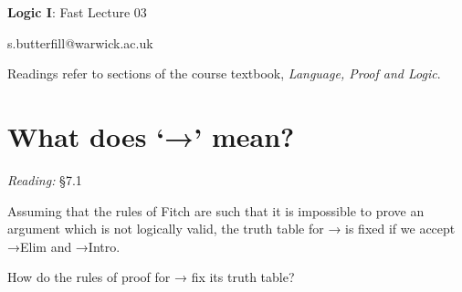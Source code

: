 \documentclass[12pt]{extarticle}
\date{}
\makeatletter
\def \ititle {Origins of Mind}
\def \isubtitle {Lecture 08}
\def \iemail{s.butterfill@warwick.ac.uk}
\makeatother
\begin{document}

\begin{multicols*}{3}

\setlength\footnotesep{1em}










\def \ititle {Logic I}
 
\def \isubtitle {Fast Lecture 03}
 
\begin{center}
 
{\Large
 
\textbf{\ititle}: \isubtitle
 
}
 
 
 
\iemail %
 
\end{center}
 
Readings refer to sections of the course textbook, \emph{Language, Proof and Logic}.
 
 
 
\section{What does ‘→’ mean?}
 
\emph{Reading:} §7.1
 
Assuming that the rules of Fitch are such that it is impossible to prove an argument which is not logically valid, the truth table for → is fixed if we accept →Elim and →Intro.
 
How do the rules of proof for → fix its truth table?
 

\end{multicols*}
\end{document}
